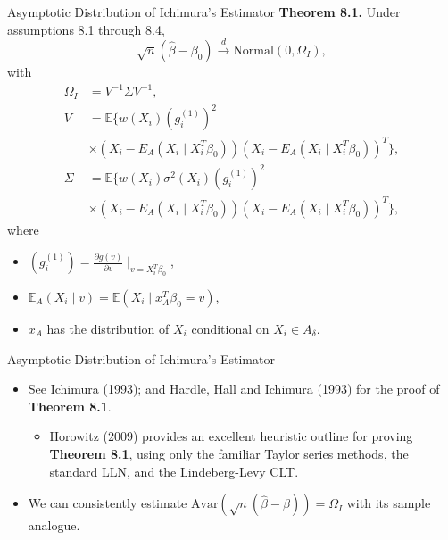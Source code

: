 \documentclass[xcolor=svgnames,dvipdfmx,cjk]{beamer}
\theoremstyle{example}
\def\Avar{\text{Avar}}
\def\E{\mathbb{E}}
\def\darrow{\xrightarrow{d}}
\begin{document}
\begin{frame}{Asymptotic Distribution of Ichimura's Estimator}
\textbf{Theorem 8.1.} Under assumptions 8.1 through 8.4,
    \[ \sqrt{n}(\hat{\beta} - \beta_0)
      \darrow \text{Normal} (0, \Omega_I),
    \]
with
  \begin{align*}
    \Omega_I &= V^{-1} \Sigma V^{-1}, \\
    V &= \E\{
      w(X_i) (g_i^{(1)})^2 \\
      & \times (X_i - E_A(X_i\mid X_i^T \beta_0)) (X_i - E_A(X_i\mid X_i^T \beta_0))^T 
    \}, \\
    \Sigma &= \E \{
      w(X_i) \sigma^2(X_i) (g_i^{(1)})^2 \\
      & \times (X_i - E_A(X_i\mid X_i^T \beta_0)) (X_i - E_A(X_i\mid X_i^T \beta_0))^T 
    \},
  \end{align*}
  where
  \begin{itemize}
    \item $(g_i^{(1)}) = \frac{\partial g(v)}{\partial v}\mid_{v= X_i^T \beta_0}$,
    \item $\E_A (X_i\mid v) = \E(X_i \mid x_A^T\beta_0 = v)$,
    \item $x_A$ has the distribution of $X_i$ conditional on $X_i \in A_\delta$.
  \end{itemize}
\end{frame}

\begin{frame}{Asymptotic Distribution of Ichimura's Estimator}
\begin{itemize}
  \item See Ichimura (1993); and Hardle, Hall and Ichimura (1993) for the proof of \textbf{Theorem 8.1}.
      \begin{itemize}
        \item Horowitz (2009) provides an excellent heuristic outline for proving \textbf{Theorem 8.1}, 
              using only the familiar Taylor series methods, the standard LLN, and the Lindeberg-Levy CLT.
      \end{itemize}
  \item We can consistently estimate 
        $\Avar\left(\sqrt{n}(\hat{\beta} - \beta)\right) = \Omega_I$ 
        with its sample analogue.
\end{itemize}
\end{frame}
\end{document}
